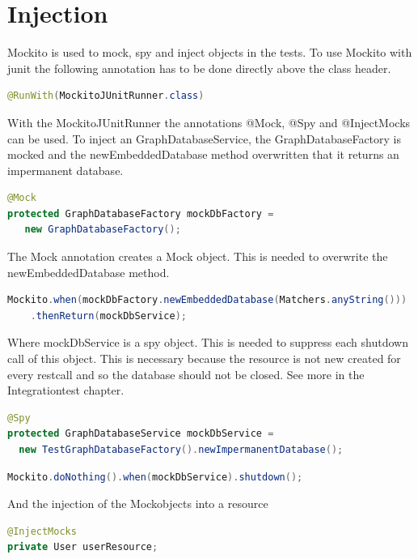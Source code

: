 \documentclass[11pt,fleqn,openany]{book} %
\begin{document}
\chapter{Injection}
Mockito is used to mock, spy and inject objects in the tests. To use Mockito with junit the following annotation has to be done directly above the class header.
\begin{lstlisting}[language=java]
@RunWith(MockitoJUnitRunner.class)
\end{lstlisting}
With the MockitoJUnitRunner the annotations @Mock, @Spy and @InjectMocks can be used. To inject an GraphDatabaseService, the GraphDatabaseFactory is mocked and the newEmbeddedDatabase method overwritten that it returns an impermanent database. 
\begin{lstlisting}[language=java]
@Mock
protected GraphDatabaseFactory mockDbFactory =
   new GraphDatabaseFactory();
\end{lstlisting}
The Mock annotation creates a Mock object. This is needed to overwrite the newEmbeddedDatabase method.
\begin{lstlisting}[language=java]
Mockito.when(mockDbFactory.newEmbeddedDatabase(Matchers.anyString()))
	.thenReturn(mockDbService);  
\end{lstlisting}
Where mockDbService is a spy object. This is needed to suppress each shutdown call of this object. This is necessary because the resource is not new created for every restcall and so the database should not be closed. See more in the Integrationtest chapter. 
\begin{lstlisting}[language=java]
@Spy
protected GraphDatabaseService mockDbService = 
  new TestGraphDatabaseFactory().newImpermanentDatabase();
\end{lstlisting}

\begin{lstlisting}[language=java]
Mockito.doNothing().when(mockDbService).shutdown();
\end{lstlisting}

And the injection of the Mockobjects into a resource

\begin{lstlisting}[language=java]
@InjectMocks
private User userResource;
\end{lstlisting}

\end{document}
